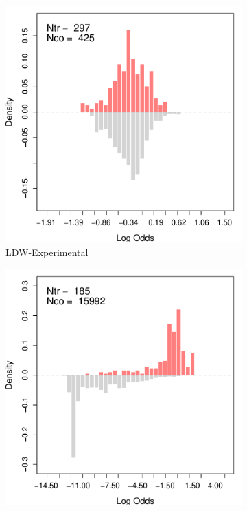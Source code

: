 \documentclass[letterpaper,12pt,leqno]{article}
\begin{document}
\begin{figure}[!ht]
    \caption{Assessing the Overlap in the LaLonde Data (Male Sample)}\label{fig:nsw.overlap}
    \centering
    \begin{minipage}[c]{.3\textwidth}
        \centering
        \begin{subfigure}{\linewidth}
            \includegraphics[width=\linewidth]{odds_nsw_exp.pdf}
            \caption{LDW-Experimental}
        \end{subfigure}
    \end{minipage}%
    \begin{minipage}[c]{.65\textwidth}
        \centering
        \begin{subfigure}{0.45\linewidth}
            \includegraphics[width=\linewidth]{odds_nsw_cps.pdf}

\end{subfigure}
\end{minipage}
\end{figure}
\end{document}
